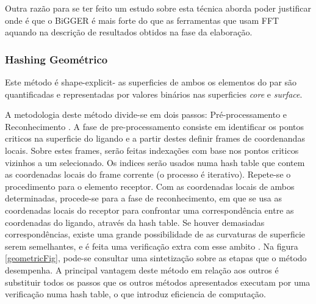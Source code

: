 Outra razão para se ter feito um estudo sobre esta técnica aborda poder justificar onde é que o BiGGER é mais forte do que as ferramentas que usam FFT aquando na descrição de resultados obtidos na fase da elaboração.
 


\subsubsection{Hashing Geométrico }
Este método é shape-explicit- as superficies de ambos os elementos do par são quantificadas e representadas por valores binários nas superficies \textit{core} e \textit{surface}.

A metodologia deste método divide-se em dois passos: Pré-processamento e Reconhecimento \cite{geometry}.
A fase de pre-processamento consiste em identificar os pontos criticos na superficie do ligando e a partir destes definir frames de coordenandas locais. Sobre estes frames, serão feitas indexações com base nos pontos criticos vizinhos a um selecionado. Os indices serão usados numa hash table que contem as coordenadas locais do frame corrente (o processo é iterativo). Repete-se o procedimento para o elemento receptor. Com as coordenadas locais de ambos determinadas, procede-se para a fase de reconhecimento, em que se usa as coordenadas locais do receptor para confrontar uma correspondência entre as coordenadas do ligando, através da hash table. Se houver demasiadas correspondências, existe uma grande possibilidade de as curvaturas de superficie serem semelhantes, e é feita uma verificação extra com esse ambito \cite{prediction}. Na figura \ref{geometricFig}, pode-se consultar uma sintetização sobre as etapas que o método desempenha. 
A principal vantagem deste método em relação aos outros é substituir todos os passos que os outros métodos apresentados executam por uma verificação numa hash table, o que introduz eficiencia de computação. 

